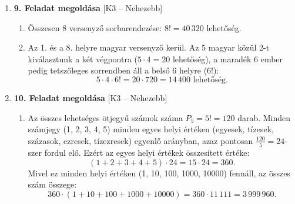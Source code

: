 \documentclass[12pt,a4paper]{article}
\begin{document}
\begin{enumerate}[label=\arabic*., leftmargin=*]
    \vspace{0.3cm}

    \item \textbf{9. Feladat megoldása} \textsf{\small [K3 – Nehezebb]}
    \begin{enumerate}[label=\alph*)]
        \item Összesen 8 versenyző sorbarendezése: $8! = 40\,320$ lehetőség.
        \item Az 1. és a 8. helyre magyar versenyző kerül. Az 5 magyar közül 2-t kiválasztunk a két végpontra ($5 \cdot 4 = 20$ lehetőség), a maradék 6 ember pedig tetszőleges sorrendben áll a belső 6 helyre ($6!$):
        \[
        5 \cdot 4 \cdot 6! = 20 \cdot 720 = 14\,400 \text{ lehetőség.}
        \]
    \end{enumerate}

    \vspace{0.3cm}

    \item \textbf{10. Feladat megoldása} \textsf{\small [K3 – Nehezebb]}
    \begin{enumerate}[label=\alph*)]
        \item Az összes lehetséges ötjegyű számok száma $P_5 = 5! = 120$ darab. 
        Minden számjegy (1, 2, 3, 4, 5) minden egyes helyi értéken (egyesek, tízesek, százasok, ezresek, tízezresek) egyenlő arányban, azaz pontosan $\frac{120}{5} = 24$-szer fordul elő.
        Ezért az egyes helyi értékek összesített értéke:
        \[
        (1 + 2 + 3 + 4 + 5) \cdot 24 = 15 \cdot 24 = 360.
        \]
        Mivel ez minden helyi értéken (1, 10, 100, 1000, 10000) fennáll, az összes szám összege:
        \[
        360 \cdot (1 + 10 + 100 + 1000 + 10000) = 360 \cdot 11\,111 = 3\,999\,960.
        \]
    \end{enumerate}

\end{enumerate}
\end{document}
